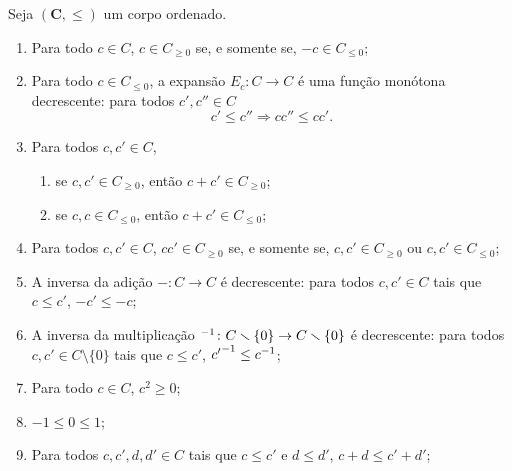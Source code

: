 \begin{proposition}
Seja $(\bm C,\leq)$ um corpo ordenado.
	\begin{enumerate}
	\item Para todo $c \in C$, $c \in C_{\geq 0}$ se, e somente se, $-c \in C_{\leq 0}$;

	\item Para todo $c \in C_{\leq 0}$, a expansão $E_c\colon C \to C$ é uma função monótona decrescente: para todos $c',c'' \in C$
		\begin{equation*}
		c' \leq c'' \Rightarrow cc'' \leq cc'.
		\end{equation*}
		
	\item Para todos $c,c' \in C$,
		\begin{enumerate}
		\item se $c,c' \in C_{\geq 0}$, então $c+c' \in C_{\geq 0}$;
		
		\item se $c,c \in C_{\leq 0}$, então $c+c' \in C_{\leq 0}$;
		
		\end{enumerate}
	
	\item Para todos $c,c' \in C$, $cc' \in C_{\geq 0}$ se, e somente se, $c,c' \in C_{\geq 0}$ ou $c,c' \in C_{\leq 0}$;
	
	\item A inversa da adição $-\colon C \to C$ é decrescente: para todos $c,c' \in C$ tais que $c \leq c'$, $-c' \leq -c$;
	
	\item A inversa da multiplicação ${}^{-1}\colon C \smallsetminus \{0\} \to C \smallsetminus \{0\}$ é decrescente: para todos $c,c' \in C \setminus \{0\}$ tais que $c \leq c'$, ${c'}^{-1} \leq c^{-1}$;
	
	\item Para todo $c \in C$, $c^2 \geq 0$;
	
	\item $-1 \leq 0 \leq 1$;
	
	\item Para todos $c,c',d,d' \in C$ tais que $c \leq c'$ e $d \leq d'$, $c+d \leq c'+d'$;
	\end{enumerate}
\end{proposition}
